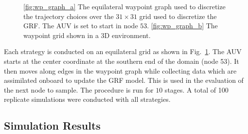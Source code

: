 \documentclass[aoas]{imsart}
\begin{document}
\begin{figure}[!b] 
\centering 
{}
\hfill
{}
\caption{\ref{fig:wp_graph_a} The equilateral waypoint graph used to discretize the
trajectory choices over the $31\times31$ grid used to discretize the GRF. The AUV is set to start in node $53$.
\ref{fig:wp_graph_b} The waypoint grid shown in a 3D environment.}
\label{fig:wp_graph}
\end{figure}

Each strategy is conducted on an equilateral grid as shown in
Fig.~\ref{fig:wp_graph}. The AUV starts at the center coordinate at
the southern end of the domain (node 53). It then moves along edges in
the waypoint graph while collecting data which are assimilated onboard
to update the GRF model. This is used in the evaluation of the next
node to sample.  The procedure is run for $10$ stages. A total of 100
replicate simulations were conducted with all strategies.

\subsection{Simulation Results}
\end{document}

